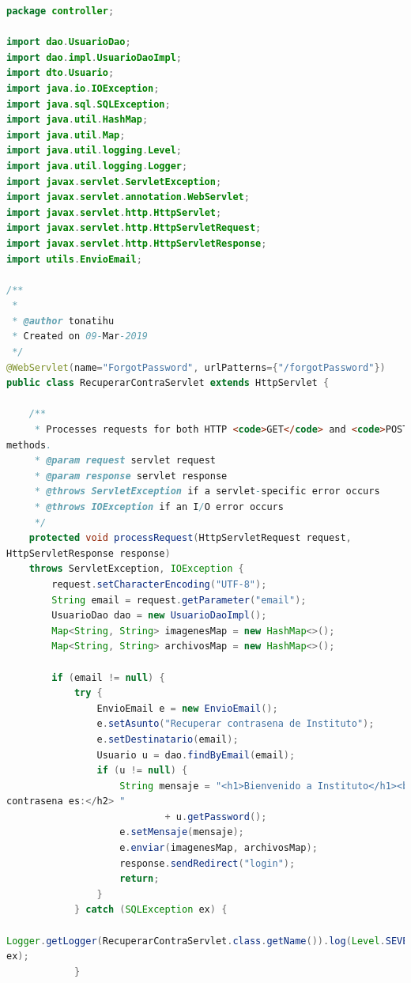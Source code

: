 \documentclass[a4paper,12pt]{article}
\begin{document}
\begin{lstlisting}[language=Java, style=customJava, 
caption={RecuperarContraServlet.java},captionpos=b,basicstyle=\fontfamily{cmss}
\small]
package controller;

import dao.UsuarioDao;
import dao.impl.UsuarioDaoImpl;
import dto.Usuario;
import java.io.IOException;
import java.sql.SQLException;
import java.util.HashMap;
import java.util.Map;
import java.util.logging.Level;
import java.util.logging.Logger;
import javax.servlet.ServletException;
import javax.servlet.annotation.WebServlet;
import javax.servlet.http.HttpServlet;
import javax.servlet.http.HttpServletRequest;
import javax.servlet.http.HttpServletResponse;
import utils.EnvioEmail;

/**
 *
 * @author tonatihu
 * Created on 09-Mar-2019
 */
@WebServlet(name="ForgotPassword", urlPatterns={"/forgotPassword"})
public class RecuperarContraServlet extends HttpServlet {
   
    /** 
     * Processes requests for both HTTP <code>GET</code> and <code>POST</code> 
methods.
     * @param request servlet request
     * @param response servlet response
     * @throws ServletException if a servlet-specific error occurs
     * @throws IOException if an I/O error occurs
     */
    protected void processRequest(HttpServletRequest request, 
HttpServletResponse response)
    throws ServletException, IOException {
        request.setCharacterEncoding("UTF-8");
        String email = request.getParameter("email");
        UsuarioDao dao = new UsuarioDaoImpl();
        Map<String, String> imagenesMap = new HashMap<>();
        Map<String, String> archivosMap = new HashMap<>();
        
        if (email != null) {
            try {
                EnvioEmail e = new EnvioEmail();
                e.setAsunto("Recuperar contrasena de Instituto");
                e.setDestinatario(email);
                Usuario u = dao.findByEmail(email);
                if (u != null) {
                    String mensaje = "<h1>Bienvenido a Instituto</h1><br><h2>Tu 
contrasena es:</h2> " 
                            + u.getPassword();
                    e.setMensaje(mensaje);
                    e.enviar(imagenesMap, archivosMap);
                    response.sendRedirect("login");
                    return;
                }
            } catch (SQLException ex) {
                
Logger.getLogger(RecuperarContraServlet.class.getName()).log(Level.SEVERE, null, 
ex);
            }
            

\end{lstlisting}
\end{document}

